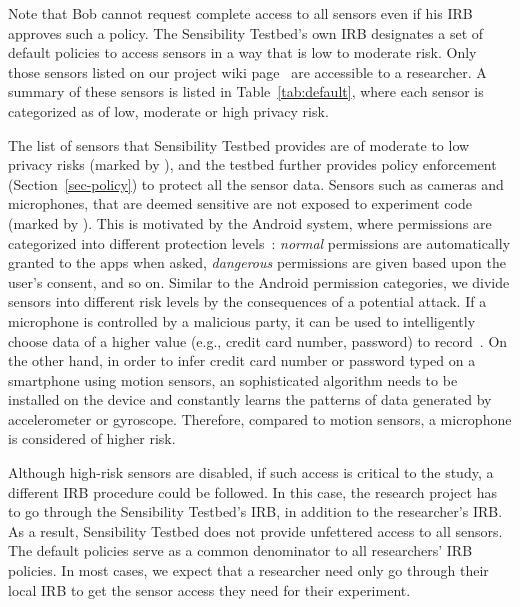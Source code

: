 Note that Bob cannot request complete access to all sensors 
even if his IRB approves such a policy. The Sensibility Testbed's
own IRB designates a set of default policies to access sensors in a
way that is low to moderate risk. 
Only those sensors listed on our project 
wiki page~\cite{sensor-api} are accessible to a researcher. 
A summary of these sensors is listed in Table~\ref{tab:default}, 
where each sensor is categorized as of low, moderate or high 
privacy risk.

The list of sensors that Sensibility Testbed provides are of moderate 
to low privacy risks (marked by \tickmark), and the testbed further provides policy enforcement
(Section~\ref{sec-policy}) to protect all the sensor data. Sensors 
such as cameras and microphones, that are deemed sensitive are not 
exposed to experiment code (marked by \xmark). This is motivated by the Android system, 
where permissions are categorized into different protection levels~\cite{level}:
\textit{normal} permissions are automatically granted to the apps when 
asked, \textit{dangerous} permissions are given based upon the 
user's consent, and so on. Similar to the Android permission categories, 
we divide sensors into different risk levels by the consequences
of a potential attack. If a microphone is controlled by 
a malicious party, it can be used to intelligently choose data of a 
higher value (e.g., credit card number, password) to record~\cite{zhang2015leave}. On the other 
hand, in order to infer credit card number or password typed on a 
smartphone using motion sensors, an sophisticated algorithm needs to 
be installed on the device and constantly learns 
the patterns of data generated by accelerometer or gyroscope. Therefore, 
compared to motion sensors, a microphone is considered of higher risk.

Although high-risk sensors are disabled, if such access  is critical to the 
study, a different IRB procedure could be followed. 
In this case, the research project has to go through the Sensibility 
Testbed's IRB, in addition to the researcher's IRB. 
%
%
As a result, Sensibility Testbed does not
provide unfettered access to all sensors. 
The default policies serve as a common denominator to all 
researchers' IRB policies. In most cases, we expect
that a researcher need only go through their local IRB to get
the sensor access they need for their experiment. 

